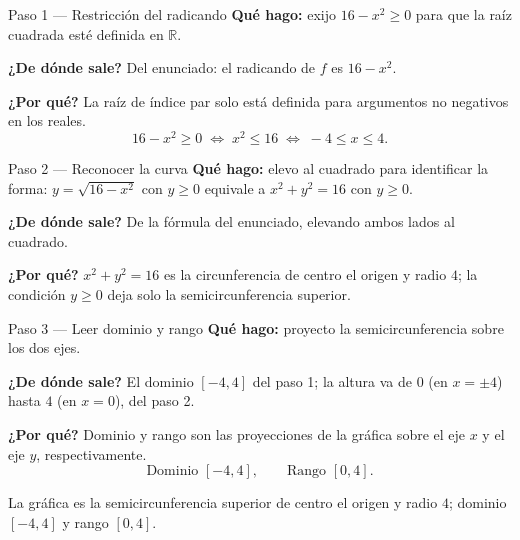 \documentclass[11pt]{article}
\begin{document}
\begin{paso}{Paso 1 --- Restricción del radicando}
\textbf{Qué hago:} exijo $16-x^2\ge 0$ para que la raíz cuadrada esté definida en $\mathbb{R}$.

\textbf{¿De dónde sale?} Del enunciado: el radicando de $f$ es $16-x^2$.

\textbf{¿Por qué?} La raíz de índice par solo está definida para argumentos no negativos en los reales.
\[
16-x^2\ge 0 \;\Longleftrightarrow\; x^2\le 16 \;\Longleftrightarrow\; -4\le x\le 4.
\]
\end{paso}

\begin{paso}{Paso 2 --- Reconocer la curva}
\textbf{Qué hago:} elevo al cuadrado para identificar la forma: $y=\sqrt{16-x^2}$ con $y\ge0$ equivale a $x^2+y^2=16$ con $y\ge0$.

\textbf{¿De dónde sale?} De la fórmula del enunciado, elevando ambos lados al cuadrado.

\textbf{¿Por qué?} $x^2+y^2=16$ es la circunferencia de centro el origen y radio $4$; la condición $y\ge0$ deja solo la semicircunferencia superior.
\begin{center}
\end{center}
\end{paso}

\begin{paso}{Paso 3 --- Leer dominio y rango}
\textbf{Qué hago:} proyecto la semicircunferencia sobre los dos ejes.

\textbf{¿De dónde sale?} El dominio $[-4,4]$ del paso 1; la altura va de $0$ (en $x=\pm4$) hasta $4$ (en $x=0$), del paso 2.

\textbf{¿Por qué?} Dominio y rango son las proyecciones de la gráfica sobre el eje $x$ y el eje $y$, respectivamente.
\[
\text{Dominio } [-4,4], \qquad \text{Rango } [0,4].
\]
\end{paso}

\begin{resp}
La gráfica es la semicircunferencia superior de centro el origen y radio $4$; dominio $[-4,4]$ y rango $[0,4]$.
\end{resp}
\end{document}
